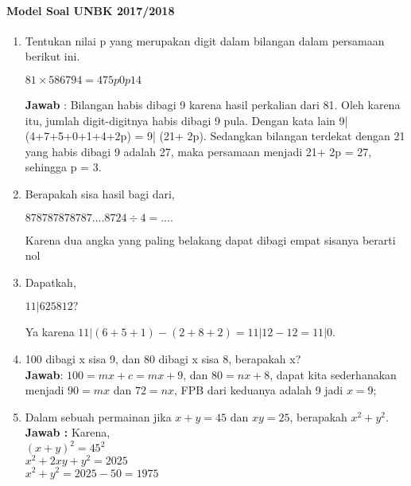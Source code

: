\paragraph{Model Soal UNBK 2017/2018}
	\begin{enumerate}
		\item Tentukan nilai p yang merupakan digit dalam bilangan dalam persamaan
		berikut ini.
		\begin{center}
			$81 \times 586794=475p0p14$\\
		\end{center}
		\textbf{Jawab} : Bilangan habis dibagi 9 karena hasil perkalian dari 81. Oleh
		karena itu, jumlah digit-digitnya habis dibagi 9 pula. Dengan kata lain 9|
		(4+7+5+0+1+4+2p) = 9| (21+ 2p). Sedangkan bilangan terdekat dengan 21
		yang habis dibagi 9 adalah 27, maka persamaan menjadi 21+ 2p = 27,
		sehingga p = 3.
	\item Berapakah sisa hasil bagi dari,
	\begin{center}
			$878787878787....8724 \div 4 = ....$
	\end{center}
	Karena dua angka yang paling belakang dapat dibagi empat sisanya berarti nol
	\item Dapatkah,
	\begin{center}
		$11|625812?$
	\end{center}
	Ya karena $11|(6+5+1)-(2+8+2)=11|12-12=11|0$.
	\item 100 dibagi x sisa 9, dan 80 dibagi x sisa 8, berapakah x?\\
	\textbf{Jawab}: $100=mx+c=mx+9$, dan $80=nx+8$, dapat kita sederhanakan menjadi $90=mx$ dan $72=nx$, FPB dari keduanya adalah 9 jadi $x=9$;
	\item Dalam sebuah permainan jika $x+y=45$ dan $xy=25$, berapakah $x^2+y^2$. \\
	\textbf{Jawab :} Karena,\\ 
	$(x+y)^2=45^2$\\
	$x^2+2xy+y^2=2025$\\
	$x^2+y^2=2025-50=1975$
	\end{enumerate}
	
		